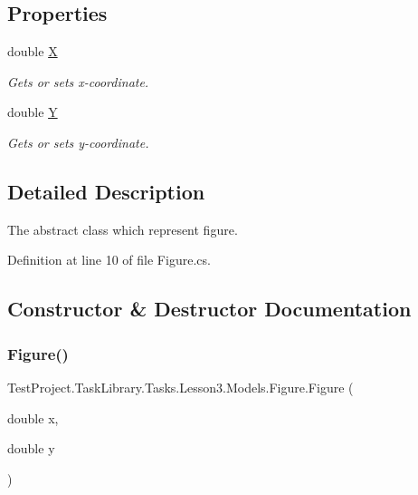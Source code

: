 \subsection*{Properties}
\begin{DoxyCompactItemize}
\item 
double \mbox{\hyperlink{class_test_project_1_1_task_library_1_1_tasks_1_1_lesson3_1_1_models_1_1_figure_ae98f10773be1e0fd538ac8f8d9d73abb}{X}}
\begin{DoxyCompactList}\small\item\em Gets or sets x-\/coordinate. \end{DoxyCompactList}\item 
double \mbox{\hyperlink{class_test_project_1_1_task_library_1_1_tasks_1_1_lesson3_1_1_models_1_1_figure_acfdf6e90e96eedf8d0d200cc6e14b071}{Y}}
\begin{DoxyCompactList}\small\item\em Gets or sets y-\/coordinate. \end{DoxyCompactList}\end{DoxyCompactItemize}


\subsection{Detailed Description}
The abstract class which represent figure. 



Definition at line 10 of file Figure.\+cs.



\subsection{Constructor \& Destructor Documentation}
\mbox{\label{class_test_project_1_1_task_library_1_1_tasks_1_1_lesson3_1_1_models_1_1_figure_a7ebe78e79c2d0f6337e4f0c7ff580c6c}} 
\subsubsection{\texorpdfstring{Figure()}{Figure()}}
{\footnotesize\ttfamily Test\+Project.\+Task\+Library.\+Tasks.\+Lesson3.\+Models.\+Figure.\+Figure (\begin{DoxyParamCaption}\item[{double}]{x,  }\item[{double}]{y }\end{DoxyParamCaption})\hspace{0.3cm}{\ttfamily [protected]}}



